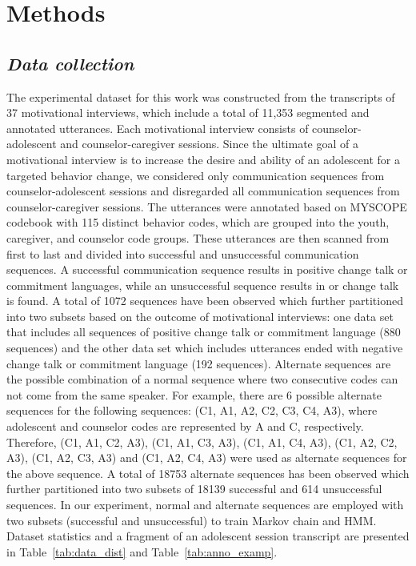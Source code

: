 \documentclass{amia}
\begin{document}
\section*{Methods}
\subsection*{\textit{Data collection}}
The experimental dataset for this work was constructed from the transcripts of 37 motivational interviews, which include a total of 11,353 segmented and annotated utterances. Each motivational interview consists of counselor-adolescent and counselor-caregiver sessions. Since the ultimate goal of a motivational interview is to increase the desire and ability of an adolescent for a targeted behavior change, we considered only communication sequences from counselor-adolescent sessions and disregarded all communication sequences from counselor-caregiver sessions. The utterances were annotated based on MYSCOPE codebook \cite{carcone2013provider} with 115 distinct behavior codes, which are grouped into the youth, caregiver, and counselor code groups. These utterances are then scanned from first to last and divided into successful and unsuccessful communication sequences. A successful communication sequence results in positive change talk or commitment languages, while an unsuccessful sequence results in or change talk is found. A total of 1072 sequences have been observed which further partitioned into two subsets based on the outcome of motivational interviews: one data set that includes all sequences of positive change talk or commitment language (880 sequences) and the other data set which includes utterances ended with negative change talk or commitment language (192 sequences). Alternate sequences are the possible combination of a normal sequence where two consecutive codes can not come from the same speaker. For example, there are 6 possible alternate sequences for the following sequences: (C1, A1, A2, C2, C3, C4, A3), where adolescent and counselor codes are represented by A and C, respectively. Therefore, (C1, A1, C2, A3), (C1, A1, C3, A3), (C1, A1, C4, A3), (C1, A2, C2, A3), (C1, A2, C3, A3) and (C1, A2, C4, A3) were used as alternate sequences for the above sequence. A total of 18753 alternate sequences has been observed which further partitioned into two subsets of 18139 successful and 614 unsuccessful sequences. In our experiment, normal and alternate sequences are employed with two subsets (successful and unsuccessful) to train Markov chain and HMM. Dataset statistics and a fragment of an adolescent session transcript are presented in Table~\ref{tab:data_dist} and Table~\ref{tab:anno_examp}. \\
\end{document}
